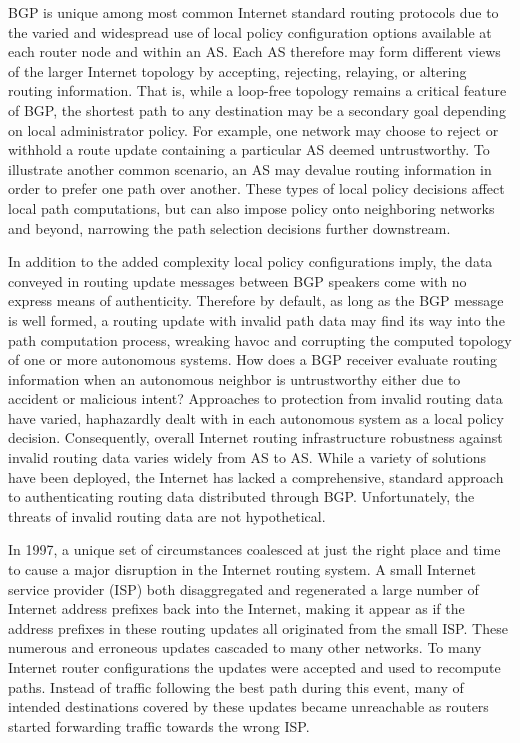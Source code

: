 \documentclass[sigconf]{acmart}
\begin{document}
BGP is unique among most common Internet standard routing protocols due
to the varied and widespread use of local policy configuration options
available at each router node and within an AS.  Each AS therefore may
form different views of the larger Internet topology by accepting,
rejecting, relaying, or altering routing information.  That is, while a
loop-free topology remains a critical feature of BGP, the shortest path
to any destination may be a secondary goal depending on local
administrator policy.  For example, one network may choose to reject or
withhold a route update containing a particular AS deemed untrustworthy.
To illustrate another common scenario, an AS may devalue routing
information in order to prefer one path over another.  These types of
local policy decisions affect local path computations, but can also
impose policy onto neighboring networks and beyond, narrowing the path
selection decisions further downstream.

In addition to the added complexity local policy configurations imply,
the data conveyed in routing update messages between BGP speakers come
with no express means of authenticity.  Therefore by default, as long as
the BGP message is well formed, a routing update with invalid path data
may find its way into the path computation process, wreaking havoc and
corrupting the computed topology of one or more autonomous systems.  How
does a BGP receiver evaluate routing information when an autonomous
neighbor is untrustworthy either due to accident or malicious intent?
Approaches to protection from invalid routing data have varied,
haphazardly dealt with in each autonomous system as a local policy
decision.  Consequently, overall Internet routing infrastructure
robustness against invalid routing data varies widely from AS to AS.
While a variety of solutions have been deployed, the Internet has lacked
a comprehensive, standard approach to authenticating routing data
distributed through BGP.  Unfortunately, the threats of invalid routing
data are not hypothetical.

In 1997, a unique set of circumstances coalesced at just the right place
and time to cause a major disruption in the Internet routing
system.\cite{barret_routing_1997}  A small Internet service provider
(ISP) both disaggregated and regenerated a large number of Internet
address prefixes back into the Internet, making it appear as if the
address prefixes in these routing updates all originated from the small
ISP.  These numerous and erroneous updates cascaded to many other
networks.  To many Internet router configurations the updates were
accepted and used to recompute paths.  Instead of traffic following the
best path during this event, many of intended destinations covered by
these updates became unreachable as routers started forwarding traffic
towards the wrong ISP.
\end{document}
